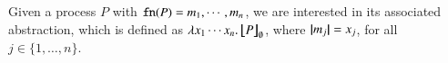 \smallskip 

\noi Given a process $P$ with $\mathtt{fn}(P) = m_1, \cdots, m_n$, we are interested in its associated abstraction, which is defined as
$\lambda x_1\cdots x_n.\,\big\lfloor\!\!\big\lfloor P\big\rfloor\!\!\big\rfloor^{}_\emptyset$, where $|\!|m_j|\!| = x_j$, for all $j \in \{1, \ldots, n\}$. 



